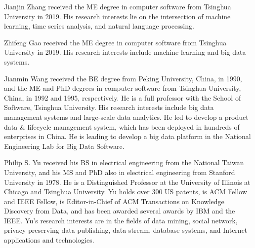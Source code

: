 \documentclass[10pt,journal,compsoc]{IEEEtran}
\begin{document}
\vspace{-30pt}
\begin{IEEEbiography}{Jianjin Zhang} received the ME degree in computer software from Tsinghua University in 2019. His research interests lie on the intersection of machine learning, time series analysis, and natural language processing.
\end{IEEEbiography}

\vspace{-30pt}
\begin{IEEEbiography}{Zhifeng Gao} received the ME degree in computer software from Tsinghua University in 2019. His research interests include machine learning and big data systems.
\end{IEEEbiography}

\vspace{-30pt}
\begin{IEEEbiography}{Jianmin Wang} received the BE degree from Peking University, China, in 1990, and the ME and PhD degrees in computer software from Tsinghua University, China, in 1992 and 1995,
respectively. He is a full professor with the School
of Software, Tsinghua University. His research interests include big data management systems and large-scale data analytics. He led to develop a product data \& lifecycle management system, which has been deployed in hundreds of enterprises in China. He is leading to develop a big data platform in the National Engineering Lab for Big Data Software.
\end{IEEEbiography}

\vspace{-30pt}
\begin{IEEEbiography}{Philip S. Yu} received his BS in electrical engineering from the National Taiwan University, and his MS and PhD also in electrical engineering from Stanford University in 1978. He is a Distinguished Professor at the University of Illinois at Chicago and Tsinghua University. Yu holds over 300 US patents, is ACM Fellow and IEEE Fellow, is Editor-in-Chief of ACM Transactions on Knowledge Discovery from Data, and has been awarded several awards by IBM and the IEEE. Yu's research interests are in the fields of data mining, social network, privacy preserving data publishing, data stream, database systems, and Internet applications and technologies. 
\end{IEEEbiography}
\end{document}

